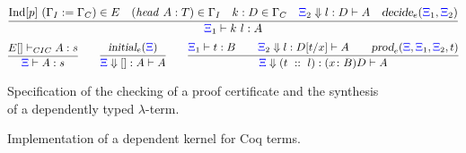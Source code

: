 \begin{figure}[t]
\[
\infer{\XXi_1\vdash k\ l : A}
      { \mathrm{Ind}[p] \ (\Gamma_I := \Gamma_C) \in E\quad 
       (\mathit{head} \ A : T)\in \Gamma_I\quad  
       k : D \in \Gamma_C\quad 
       \bc{\XXi_2}{} l D A \quad\unfoldExpert{\XXi_1}{\XXi_2}} 
\]
\vskip -18pt
\[
  \infer{\XXi\vdash  A : s}{{E[] \vdash_{CIC} A : s}}%
  \qquad
  \infer{\bc{\XXi}{}{[]} A A}{\initLExpert{\XXi}}
  \qquad
  \infer{\bc{\XXi}{}{(t\ ::\ l)}{\depprod{x}{B}{D}}{A}}
        {\XXi_1\vdash t : B\qquad
         \bc{\XXi_2}{}l {D[t/x]} A\qquad
         \prodE{\XXi}{\XXi_1}{\XXi_2}{t}}
\]
\caption{Specification of the checking of a proof certificate and the
  synthesis of a dependently typed $\lambda$-term.}
\label{fig:augmented}
\end{figure}

\begin{figure}


\caption{Implementation of a  dependent kernel for Coq terms.}
\label{fig:kernel}
\end{figure}

